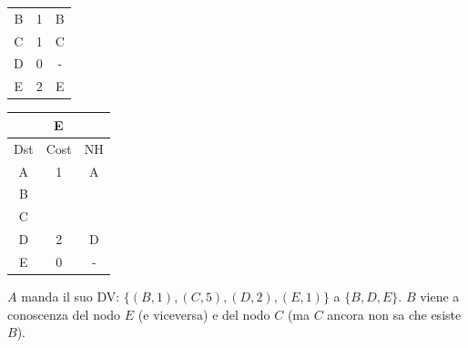 \documentclass[10pt]{article}
\begin{document}
\begin{table}[h!]
\begin{tabular}{|c||c||c|}
 			B & 1 & B \\
 			C & 1 & C \\
 			D & 0 & - \\
 			E & 2 & E \\
 			\hline
		\end{tabular}
		\begin{tabular}{|c||c||c|}
 			\hline
	 		\multicolumn{3}{|c|}{E} \\
 			\hline
 			Dst & Cost & NH\\
 			\hline
 			A & 1 & A \\
 			B &   &   \\
 			C &   &   \\
 			D & 2 & D \\
 			E & 0 & - \\
 			\hline
		\end{tabular}
	\end{table}
	\newline \newline
	$A$ manda il suo DV: $\{(B,1),(C,5),(D,2),(E,1)\}$ a $\{B,D,E\}$.
	\newline
	$B$ viene a conoscenza del nodo $E$ (e viceversa) e del nodo $C$ (ma $C$ ancora non sa che esiste $B$).
\end{document}
